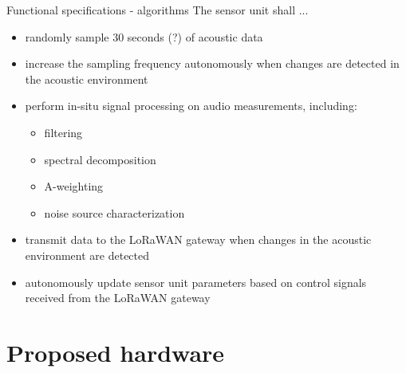\documentclass{beamer}
\begin{document}
    \begin{frame}{Functional specifications - algorithms}
    The sensor unit shall ... 
        \begin{itemize}
            \item randomly sample 30 seconds (?) of acoustic data 
            \item increase the sampling frequency autonomously when changes are detected in the acoustic environment
            \item perform in-situ signal processing on audio measurements, including:
                \begin{itemize}
                    \item filtering
                    \item spectral decomposition
                    \item A-weighting
                    \item noise source characterization
                \end{itemize} 
            \item transmit data to the LoRaWAN gateway when changes in the acoustic environment are detected
            \item autonomously update sensor unit parameters based on control signals received from the LoRaWAN gateway
        \end{itemize}
    \end{frame}

\section{Proposed hardware}
\end{document}
